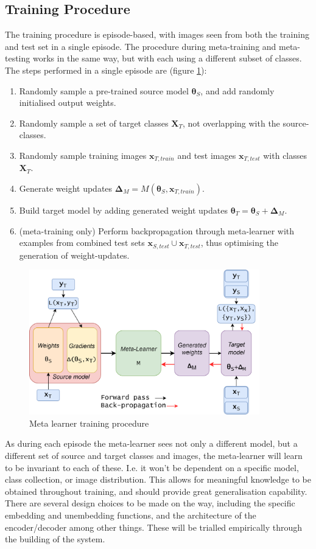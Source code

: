 \documentclass{report}
\begin{document}
	\subsection{Training Procedure}
	The training procedure is episode-based, with images seen from both the training and test set in a single episode. The procedure during meta-training and meta-testing works in the same way, but with each using a different subset of classes. The steps performed in a single episode are (figure \ref{fig:ml:2}):
	\begin{enumerate}
		\item Randomly sample a pre-trained source model $\bm{\theta}_S$, and add randomly initialised output weights.
		\item Randomly sample a set of target classes $\bm{X}_T$, not overlapping with the source-classes.
		\item Randomly sample training images $\bm{x}_{T,train}$ and test images $\bm{x}_{T,test}$ with classes $\bm{X}_T$.
		\item Generate weight updates $\bm{\Delta}_M = M(\bm{\theta}_S, \bm{x}_{T,train})$.
		\item Build target model by adding generated weight updates $\bm{\theta}_T = \bm{\theta}_S + \bm{\Delta}_M$.
		\item (meta-training only) Perform backpropagation through meta-learner with examples from combined test sets $\bm{x}_{S,test} \cup \bm{x}_{T,test}$, thus optimising the generation of weight-updates.
	\end{enumerate}
	\begin{figure}[h]
		\centering
		\includegraphics[width=10cm]{metalearneroverview}
		\caption{Meta learner training procedure}
		\label{fig:ml:2}
	\end{figure}
	As during each episode the meta-learner sees not only a different model, but a different set of source and target classes and images, the meta-learner will learn to be invariant to each of these. I.e. it won't be dependent on a specific model, class collection, or image distribution. This allows for meaningful knowledge to be obtained throughout training, and should provide great generalisation capability. \newline \newline
	There are several design choices to be made on the way, including the specific embedding and unembedding functions, and the architecture of the encoder/decoder among other things. These will be trialled empirically through the building of the system.
	
\end{document}
